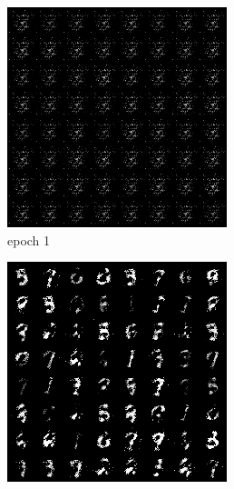 \documentclass[a4paper]{article}
\theoremstyle{definition}
\newenvironment{soln}{
	\leavevmode\color{blue}\ignorespaces
}{}
\begin{document}
\begin{enumerate} [label=(\alph*)]
\begin{soln}
    		\begin{figure}[H]
    			\centering
    			\begin{subfigure}[b]{0.3\textwidth}
    				\centering
    				\includegraphics[width=\textwidth]{hw6/1.a/1_a_gen_img1.png}
    				\caption{epoch 1}
    			\end{subfigure}
    			\hfill
    			\begin{subfigure}[b]{0.3\textwidth}
    				\centering
    				\includegraphics[width=\textwidth]{hw6/1.a/1_a_gen_img50.png}

\end{subfigure}
\end{figure}
\end{soln}
\end{enumerate}
\end{document}
